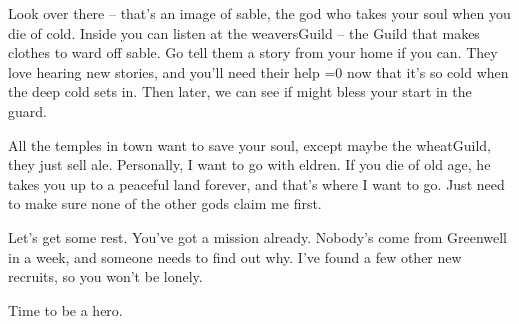 \begin{multicols}{2}
\begin{exampletext}
  Look over there -- that's an image of \gls{sable}, the god who takes your soul when you die of cold.
  Inside you can listen at the \gls{weaversGuild} -- the Guild that makes clothes to ward off \gls{sable}.
  Go tell them a story from your home if you can.
  They love hearing new stories, and you'll need their help \ifnum\value{temperature}=0 now that it's so cold \else when the deep cold sets in\fi.
  Then later, we can see if  might bless your start in the \gls{guard}.

  All the temples in town want to save your soul, except maybe the \gls{wheatGuild}, they just sell ale.
  Personally, I want to go with \gls{eldren}.
  If you die of old age, he takes you up to a peaceful land forever, and that's where I want to go.
  Just need to make sure none of the other gods claim me first.

  Let's get some rest.
  You've got a mission already.
  Nobody's come from Greenwell in a week, and someone needs to find out why.
  I've found a few other new recruits, so you won't be lonely.

  Time to be a hero.

\end{exampletext}

\end{multicols}
